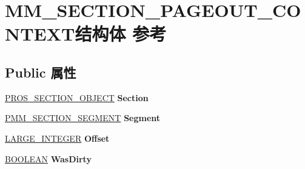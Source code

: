 \hypertarget{struct_m_m___s_e_c_t_i_o_n___p_a_g_e_o_u_t___c_o_n_t_e_x_t}{}\section{M\+M\+\_\+\+S\+E\+C\+T\+I\+O\+N\+\_\+\+P\+A\+G\+E\+O\+U\+T\+\_\+\+C\+O\+N\+T\+E\+X\+T结构体 参考}
\label{struct_m_m___s_e_c_t_i_o_n___p_a_g_e_o_u_t___c_o_n_t_e_x_t}
\subsection*{Public 属性}
\begin{DoxyCompactItemize}
\item 
\mbox{\label{struct_m_m___s_e_c_t_i_o_n___p_a_g_e_o_u_t___c_o_n_t_e_x_t_adf321101909ba237250c7f6902c18032}} 
\hyperlink{struct___r_o_s___s_e_c_t_i_o_n___o_b_j_e_c_t}{P\+R\+O\+S\+\_\+\+S\+E\+C\+T\+I\+O\+N\+\_\+\+O\+B\+J\+E\+CT} {\bfseries Section}
\item 
\mbox{\label{struct_m_m___s_e_c_t_i_o_n___p_a_g_e_o_u_t___c_o_n_t_e_x_t_a5bd979fc9ce0e557f1c05995fec16885}} 
\hyperlink{struct___m_m___s_e_c_t_i_o_n___s_e_g_m_e_n_t}{P\+M\+M\+\_\+\+S\+E\+C\+T\+I\+O\+N\+\_\+\+S\+E\+G\+M\+E\+NT} {\bfseries Segment}
\item 
\mbox{\label{struct_m_m___s_e_c_t_i_o_n___p_a_g_e_o_u_t___c_o_n_t_e_x_t_a86f7eb20b1652001103af1ce2e5b01c8}} 
\hyperlink{union___l_a_r_g_e___i_n_t_e_g_e_r}{L\+A\+R\+G\+E\+\_\+\+I\+N\+T\+E\+G\+ER} {\bfseries Offset}
\item 
\mbox{\label{struct_m_m___s_e_c_t_i_o_n___p_a_g_e_o_u_t___c_o_n_t_e_x_t_a54edd60663de76714560883420570dd9}} 
\hyperlink{_processor_bind_8h_a112e3146cb38b6ee95e64d85842e380a}{B\+O\+O\+L\+E\+AN} {\bfseries Was\+Dirty}
\item 
\mbox{\label{struct_m_m___s_e_c_t_i_o_n___p_a_g_e_o_u_t___c_o_n_t_e_x_t_a096a4d27ec3bc32362a32aa198bcf6b7}} 

\end{DoxyCompactItemize}
